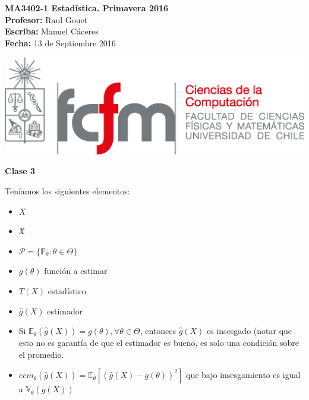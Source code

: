 \documentclass[10pt]{article}
\theoremstyle{plain}
\theoremstyle{definition}
\newcommand{\catnum}{3} %
\newcommand{\fecha}{13 de Septiembre 2016 }
\begin{document}
\vspace*{-1.2 cm}
\begin{minipage}{0.6\textwidth}
\begin{flushleft}
\hspace*{-0.5cm}\textbf{MA3402-1 Estadística. Primavera 2016}\\
\hspace*{-0.5cm}\textbf{Profesor:} Raul Gouet\\
\hspace*{-0.5cm}\textbf{Escriba:} Manuel Cáceres\\
\hspace*{-0.5cm}\textbf{Fecha:} \fecha
\end{flushleft}
\end{minipage}
\begin{minipage}{0.36\textwidth}
\begin{flushright}
\includegraphics[scale=0.3]{imagenes/fcfm_dcc}
\end{flushright}
\end{minipage}
\bigskip

\begin{center}
\LARGE\textbf{Clase \catnum}
\end{center}
Teníamos los siguientes elementos:
\begin{itemize}
\item $X$
\item $\mathfrak{X}$
\item $\mathcal{P} = \{\mathbb{P}_{\theta}\colon \theta \in \Theta\}$
\item $g(\theta)$ función a estimar
\item $T(X)$ estadístico
\item $\hat{g}(X)$ estimador
\item Si $\mathbb{E}_{\theta}(\hat{g}(X)) = g(\theta), \forall \theta \in \Theta$, entonces $\hat{g}(X)$  es insesgado (notar que esto no es garantía de que el estimador es bueno, es solo una condición sobre el promedio.
\item $ecm_{\theta}(\hat{g}(X)) = \mathbb{E}_{\theta}\left[(\hat{g}(X)-g(\theta))^2\right]$ que bajo insesgamiento es igual a $\mathbb{V}_{\theta}(\hat{g}(X))$
\end{itemize}
\end{document}
